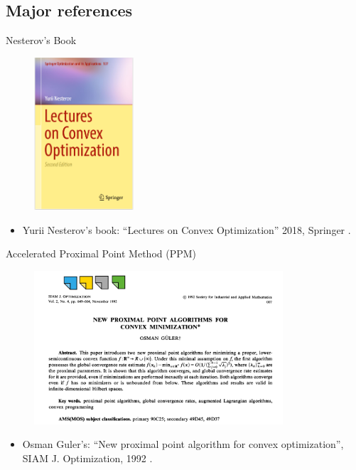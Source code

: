 \documentclass[11pt]{beamer}
\begin{document}
    \subsection{Major references}
        \begin{frame}{Nesterov's Book}
            \begin{figure}
                \centering
                \includegraphics[width=10em]{assets/Nesterov Book.png}    
            \end{figure}
            \begin{itemize}
                \item Yurii Nesterov's book: ``Lectures on Convex Optimization'' 2018, Springer \cite{nesterov_lectures_2018}. 
            \end{itemize}
        \end{frame}
        \begin{frame}{Accelerated Proximal Point Method (PPM)}
            \begin{figure}
                \centering
                \includegraphics[width=25em]{assets/Acc ppm}
            \end{figure}
            \begin{itemize}
                \item Osman Guler's: ``New proximal point algorithm for convex optimization'', SIAM J. Optimization, 1992 \cite{guler_new_1992}. 
            \end{itemize}
        \end{frame}
\end{document}
